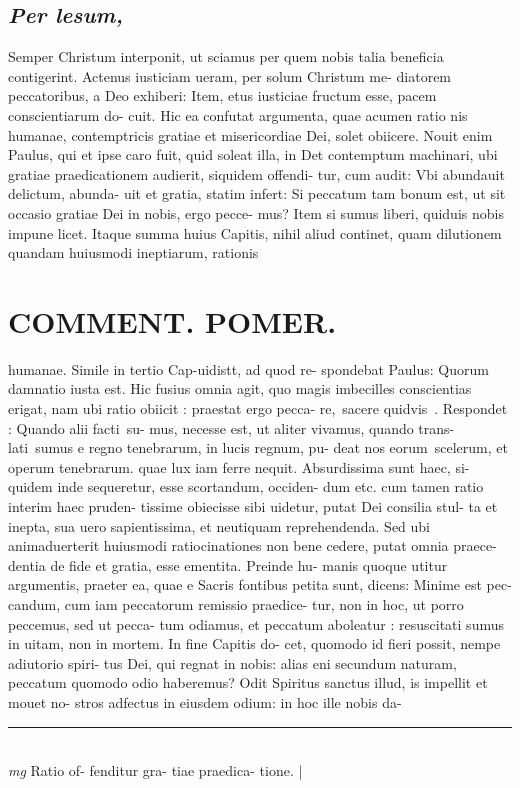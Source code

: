 \documentclass{article}
\begin{document}
\begin{pages}
\subsection*{\textit{Per lesum, }}\pstart Semper Christum interponit, ut sciamus per quem nobis talia beneficia contigerint.   \pend\pstart Actenus iusticiam ueram, per solum Christum me- diatorem peccatoribus, a Deo exhiberi: Item, etus iusticiae fructum esse, pacem conscientiarum do- cuit. Hic ea confutat argumenta, quae acumen ratio nis humanae, contemptricis gratiae et misericordiae Dei, solet obiicere. Nouit enim Paulus, qui et ipse caro fuit, quid soleat illa, in Det contemptum machinari, ubi gratiae praedicationem audierit, siquidem offendi- tur, cum audit: Vbi abundauit delictum, abunda- uit et gratia, statim infert: Si peccatum tam bonum est, ut sit occasio gratiae Dei in nobis, ergo pecce- mus? Item si sumus liberi, quiduis nobis impune licet.  Itaque summa huius Capitis, nihil aliud continet, quam dilutionem quandam huiusmodi ineptiarum, rationis  \pend
\section*{COMMENT. POMER.  }\pstart humanae. Simile in tertio Cap-uidistt, ad quod re- spondebat Paulus: Quorum damnatio iusta est. Hic fusius omnia agit, quo magis imbecilles conscientias erigat, nam ubi ratio obiicit : praestat ergo pecca- re, sacere quidvis . Respondet : Quando alii facti su- mus, necesse est, ut aliter vivamus, quando trans- lati sumus e regno tenebrarum, in lucis regnum, pu- deat nos eorum scelerum, et operum tenebrarum. quae lux iam ferre nequit. Absurdissima sunt haec, si- quidem inde sequeretur, esse scortandum, occiden- dum etc. cum tamen ratio interim haec pruden- tissime obiecisse sibi uidetur, putat Dei consilia stul- ta et inepta, sua uero sapientissima, et neutiquam reprehendenda. Sed ubi animaduerterit huiusmodi ratiocinationes non bene cedere, putat omnia praece- dentia de fide et gratia, esse ementita. Preinde hu- manis quoque utitur argumentis, praeter ea, quae e Sacris fontibus petita sunt, dicens: Minime est pec- candum, cum iam peccatorum remissio praedice- tur, non in hoc, ut porro peccemus, sed ut pecca- tum odiamus, et peccatum aboleatur : resuscitati sumus in uitam, non in mortem. In fine Capitis do- cet, quomodo id fieri possit, nempe adiutorio spiri- tus Dei, qui regnat in nobis: alias eni secundum naturam, peccatum quomodo odio haberemus? Odit Spiritus sanctus illud, is impellit et mouet no- stros adfectus in eiusdem odium: in hoc ille nobis da-  \pend
\vspace{0.5cm}\noindent
\vspace{0.2cm}\rule{1cm}{0.2pt}\\ 
\hspace{0.2cm}\textit{mg}
\footnotesize Ratio of- fenditur gra- tiae praedica- tione.  
\normalsize| 

\end{pages}
\end{document}

